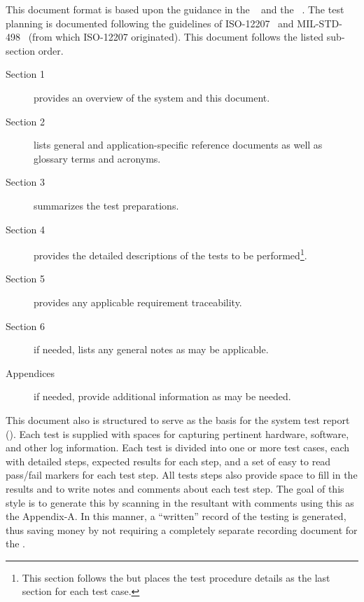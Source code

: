 This document format is based upon the guidance in the \STD{} \DID~\cite{ref__STD_DID} and the \STR{} \DID~\cite{ref__STR_DID}.
The test planning is documented following the guidelines of ISO-12207~\cite{ref__ISO_12207} and MIL-STD-498~\cite{ref__MIL_STD_498} (from which ISO-12207 originated).
This document follows the listed \STS sub-section order.
\begin{description}
	\item[Section 1] provides an overview of the system and this document.
	\item[Section 2] lists general and application-specific reference documents as well as glossary terms and acronyms. 
	\item[Section 3] summarizes the test preparations.
	\item[Section 4] provides the detailed descriptions of the tests to be performed\footnote{This section follows the \DID but places the test procedure details as the last section for each test case.}. 
	\item[Section 5] provides any applicable requirement traceability.
	\item[Section 6] if needed, lists any general notes as may be applicable.
	\item[Appendices] if needed, provide additional information as may be needed.
\end{description}


This document also is structured to serve as the basis for the system test report (\STR).
Each test is supplied with spaces for capturing pertinent hardware, software, and other log information.
Each test is divided into one or more test cases, each with detailed steps, expected results for each step, and a set of easy to read pass/fail markers for each test step.
All tests steps also provide space to fill in the results and to write notes and comments about each test step.
The goal of this style is to generate this \STR by scanning in the resultant \STS with comments using this as the  \STR Appendix-A.
In this manner, a ``written'' record of the testing is generated, thus saving money by not requiring a completely separate recording document for the \STR.


